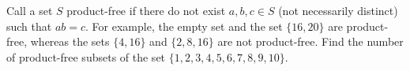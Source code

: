 Call a set $S$ product-free if there do not exist $a, b, c \in S$ (not necessarily distinct) such that $a b = c$. For example, the empty set and the set $\{16, 20\}$ are product-free, whereas the sets $\{4, 16\}$ and $\{2, 8, 16\}$ are not product-free. Find the number of product-free subsets of the set $\{1, 2, 3, 4, 5, 6, 7, 8, 9, 10\}$.